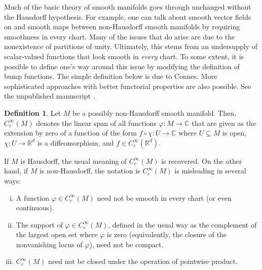 \documentclass[12pt]{article}
\theoremstyle{plain}
\theoremstyle{definition}
\newtheorem{defn}[thm]{Definition}
\newcommand{\R}{\mathbb{R}}
\newcommand{\C}{\mathbb{C}}
\numberwithin{equation}{section}
\begin{document}
Much  of the basic theory of smooth manifolds goes  through unchanged without the Hausdorff hypothesis. For example,  one can talk about smooth vector fields on and smooth maps between non-Hausdorff smooth manifolds by requiring smoothness in every chart. Many of the  issues that do arise are due to the nonexistence of partitions of unity. Ultimately, this stems from an undersupply of scalar-valued functions that look smooth in \emph{every} chart. To some extent, it is possible to define one's way around this issue by modifying the definition of bump functions. The simple definition below is due to Connes. More sophisticated approaches with better functorial properties are also possible. See the unpublished manuscript \cite{Crainc-Moerdijk}.



\begin{defn}\label{nonHausbump}
Let $M$ be a possibly non-Hausdorff smooth manifold. Then, $C_c^\infty(M)$ denotes the linear span of all functions $\varphi : M \to \C$ that are given as the extension by zero of a function of the form $f \circ \chi : U \to \C$ where $U \subseteq M$ is open, $\chi : U \to \R^d$ is a diffeomorphism, and $f \in C_c^\infty(\R^d)$.
\end{defn}











If $M$ is Hausdorff, the usual meaning of $C_c^\infty(M)$ is recovered. On the other hand, if $M$ is non-Hausdorff, the  notation is $C_c^\infty(M)$ is misleading in several ways:
\begin{enumerate}[(i)]
\item A function $\varphi \in C_c^\infty(M)$ need not be  smooth in every chart (or even continuous). \item The support of $\varphi \in C_c^\infty(M)$, defined in the usual way as the complement of the largest open set where $\varphi$ is zero (equivalently, the closure of the nonvanishing locus of $\varphi$), need not be compact. 
\item $C_c^\infty(M)$ need not be closed under the operation of  pointwise product.
\end{enumerate}
\end{document}

